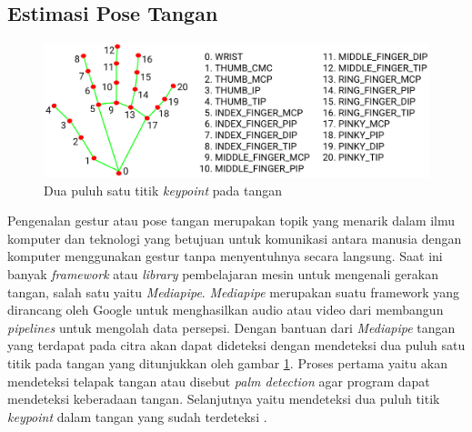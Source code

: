 \subsection{Estimasi Pose Tangan}
\begin{figure}[!h]
  \centering
	\includegraphics[width=0.7\linewidth]{gambar/hand_landmarks.png}
	\caption{Dua puluh satu titik \textit{keypoint} pada tangan \parencite{mediapipe}}
	\label{fig:tangan}
\end{figure}
Pengenalan gestur atau pose tangan merupakan topik yang menarik dalam ilmu komputer dan teknologi yang betujuan untuk komunikasi antara manusia dengan komputer menggunakan gestur tanpa menyentuhnya secara langsung. Saat ini banyak \textit{framework} atau \textit{library} pembelajaran mesin untuk mengenali gerakan tangan, salah satu yaitu \textit{Mediapipe}. \textit{Mediapipe} merupakan suatu framework yang dirancang oleh Google untuk menghasilkan audio atau video dari membangun \textit{pipelines} untuk mengolah data persepsi. Dengan bantuan dari \textit{Mediapipe} tangan yang terdapat pada citra akan dapat dideteksi dengan mendeteksi dua puluh satu titik pada tangan yang ditunjukkan oleh gambar \ref*{fig:tangan}. Proses pertama yaitu akan mendeteksi telapak tangan atau disebut \textit{palm detection} agar program dapat mendeteksi keberadaan tangan. Selanjutnya yaitu mendeteksi dua puluh titik \textit{keypoint} dalam tangan yang sudah terdeteksi \parencite{UniversitasDinamika}. 


